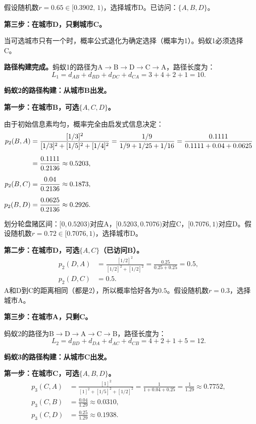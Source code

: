 \documentclass[lang=cn,zihao=-4,a4paper,fontset=windows]{beautybook}
\begin{document}
假设随机数$r=0.65 \in [0.3902,\, 1)$，选择城市D。已访问：$\{A, B, D\}$。

\textbf{第三步：在城市D，只剩城市C。}

当可选城市只有一个时，概率公式退化为确定选择（概率为1）。蚂蚁1必须选择C。

\textbf{路径构建完成。}蚂蚁1的路径为A$\to$B$\to$D$\to$C$\to$A，路径长度为：
\[
L_1 = d_{AB} + d_{BD} + d_{DC} + d_{CA} = 3 + 4 + 2 + 1 = 10.
\]

\textbf{蚂蚁2的路径构建：从城市B出发。}

\textbf{第一步：在城市B，可选$\{A, C, D\}$。}

由于初始信息素均匀，概率完全由启发式信息决定：
\begin{align*}
p_2(B,A) &= \frac{[1/3]^2}{[1/3]^2 + [1/5]^2 + [1/4]^2} = \frac{1/9}{1/9 + 1/25 + 1/16} = \frac{0.1111}{0.1111 + 0.04 + 0.0625} \notag \\[6pt]
&= \frac{0.1111}{0.2136} \approx 0.5203, \\[6pt]
p_2(B,C) &= \frac{0.04}{0.2136} \approx 0.1873, \\[6pt]
p_2(B,D) &= \frac{0.0625}{0.2136} \approx 0.2926.
\end{align*}

划分轮盘赌区间：$[0, 0.5203)$对应A，$[0.5203, 0.7076)$对应C，$[0.7076, 1)$对应D。假设随机数$r=0.72 \in [0.7076, 1)$，选择城市D。

\textbf{第二步：在城市D，可选$\{A, C\}$（已访问B）。}
\begin{align*}
p_2(D,A) &= \frac{[1/2]^2}{[1/2]^2 + [1/2]^2} = \frac{0.25}{0.25 + 0.25} = 0.5, \\[4pt]
p_2(D,C) &= 0.5.
\end{align*}
A和D到C的距离相同（都是2），所以概率恰好各为$0.5$。假设随机数$r=0.3$，选择城市A。

\textbf{第三步：在城市A，只剩C。}

蚂蚁2的路径为B$\to$D$\to$A$\to$C$\to$B，路径长度为：
\[
L_2 = d_{BD} + d_{DA} + d_{AC} + d_{CB} = 4 + 2 + 1 + 5 = 12.
\]

\textbf{蚂蚁3的路径构建：从城市C出发。}

\textbf{第一步：在城市C，可选$\{A, B, D\}$。}
\begin{align*}
p_3(C,A) &= \frac{[1]^2}{[1]^2 + [1/5]^2 + [1/2]^2} = \frac{1}{1 + 0.04 + 0.25} = \frac{1}{1.29} \approx 0.7752, \\[6pt]
p_3(C,B) &= \frac{0.04}{1.29} \approx 0.0310, \\[6pt]
p_3(C,D) &= \frac{0.25}{1.29} \approx 0.1938.
\end{align*}
\end{document}
